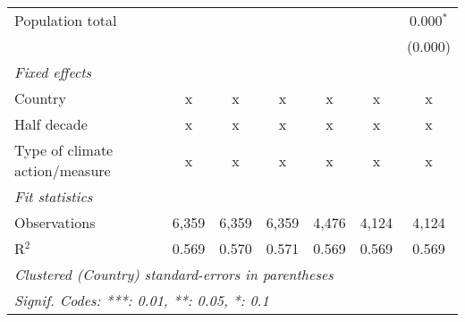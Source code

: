 \begin{tabular}{lcccccc}
   Population total                                                &         &                &                &                &                & 0.000$^{*}$\\   
                                                                   &         &                &                &                &                & (0.000)\\   
   \emph{Fixed effects}\\
   Country                                                         & x       & x              & x              & x              & x              & x\\  
   Half decade                                                     & x       & x              & x              & x              & x              & x\\  
   Type of climate action/measure                                  & x       & x              & x              & x              & x              & x\\  
   \midrule \emph{Fit statistics}\\
   Observations                                                    & 6,359   & 6,359          & 6,359          & 4,476          & 4,124          & 4,124\\  
   R$^2$                                                           & 0.569   & 0.570          & 0.571          & 0.569          & 0.569          & 0.569\\  
   \midrule
   \multicolumn{7}{l}{\emph{Clustered (Country) standard-errors in parentheses}}\\
   \multicolumn{7}{l}{\emph{Signif. Codes: ***: 0.01, **: 0.05, *: 0.1}}\\
\end{tabular}
\par\endgroup


